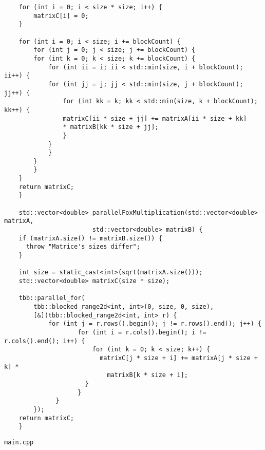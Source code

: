 \documentclass{article}
\begin{document}
\begin{lstlisting}
  	for (int i = 0; i < size * size; i++) {
    	matrixC[i] = 0;
  	}

  	for (int i = 0; i < size; i += blockCount) {
    	for (int j = 0; j < size; j += blockCount) {
      	for (int k = 0; k < size; k += blockCount) {
        	for (int ii = i; ii < std::min(size, i + blockCount); ii++) {
          	for (int jj = j; jj < std::min(size, j + blockCount); jj++) {
            	for (int kk = k; kk < std::min(size, k + blockCount); kk++) {
              	matrixC[ii * size + jj] += matrixA[ii * size + kk]
              	* matrixB[kk * size + jj];
            	}
          	}
        	}
      	}
    	}
  	}
  	return matrixC;
	}

	std::vector<double> parallelFoxMultiplication(std::vector<double> matrixA,
    	                std::vector<double> matrixB) {
  	if (matrixA.size() != matrixB.size()) {
  	  throw "Matrice's sizes differ";
  	}

  	int size = static_cast<int>(sqrt(matrixA.size()));
  	std::vector<double> matrixC(size * size);

  	tbb::parallel_for(
    	tbb::blocked_range2d<int, int>(0, size, 0, size),
    	[&](tbb::blocked_range2d<int, int> r) {
        	for (int j = r.rows().begin(); j != r.rows().end(); j++) {
                	for (int i = r.cols().begin(); i != r.cols().end(); i++) {
                	    for (int k = 0; k < size; k++) {
              	          matrixC[j * size + i] += matrixA[j * size + k] *
            	            matrixB[k * size + i];
          	          }
        	        }
      	      }
    	});
  	return matrixC;
	}
\end{lstlisting}
\par
\lstinline$main.cpp$
\end{document}
